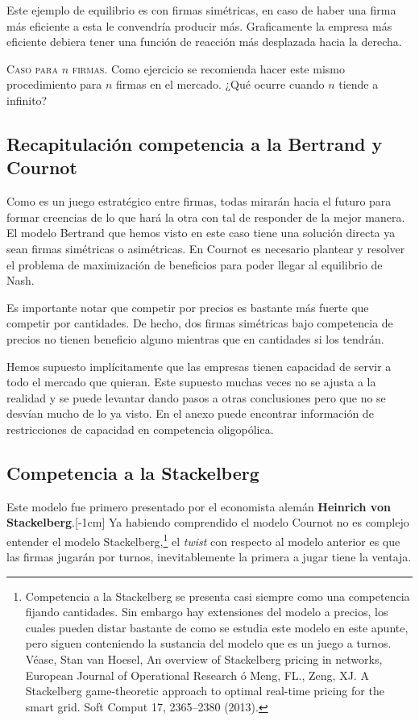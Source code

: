 Este ejemplo de equilibrio es con firmas simétricas, en caso de haber una firma más eficiente a esta le convendría producir más. Graficamente la empresa más eficiente debiera tener una función de reacción más desplazada hacia la derecha. 

\textsc{Caso para $n$ firmas}.
Como ejercicio se recomienda hacer este mismo procedimiento para $n$ firmas en el mercado. ¿Qué ocurre cuando $n$ tiende a infinito?

\subsection*{Recapitulación competencia a la Bertrand y Cournot}

Como es un juego estratégico entre firmas, todas mirarán hacia el futuro para formar creencias de lo que hará la otra con tal de responder de la mejor manera. El modelo Bertrand que hemos visto en este caso tiene una solución directa ya sean firmas simétricas o asimétricas. En Cournot es necesario plantear y resolver el problema de maximización de beneficios para poder llegar al equilibrio de Nash. 

Es importante notar que competir por precios es bastante más fuerte que competir por cantidades. De hecho, dos firmas simétricas bajo competencia de precios no tienen beneficio alguno mientras que en cantidades si los tendrán.

Hemos supuesto implícitamente que las empresas tienen capacidad de servir a todo el mercado que quieran. Este supuesto muchas veces no se ajusta a la realidad y se puede levantar dando pasos a otras conclusiones pero que no se desvían mucho de lo ya visto. En el anexo puede encontrar información de restricciones de capacidad en competencia oligopólica. 

\subsection{Competencia a la Stackelberg}

Este modelo fue primero presentado por el economista alemán \textbf{Heinrich von Stackelberg}.[-1cm] Ya habiendo comprendido el modelo Cournot no es complejo entender el modelo Stackelberg,\footnote{Competencia a la Stackelberg se presenta casi siempre como una competencia fijando cantidades. Sin embargo hay extensiones del modelo a precios, los cuales pueden distar bastante de como se estudia este modelo en este apunte, pero siguen conteniendo la sustancia del modelo que es un juego a turnos. Véase, Stan van Hoesel,
An overview of Stackelberg pricing in networks,
European Journal of Operational Research ó Meng, FL., Zeng, XJ. A Stackelberg game-theoretic approach to optimal real-time pricing for the smart grid. Soft Comput 17, 2365–2380 (2013).} el \textit{twist} con respecto al modelo anterior es que las firmas jugarán por turnos, inevitablemente la primera a jugar tiene la ventaja. 

